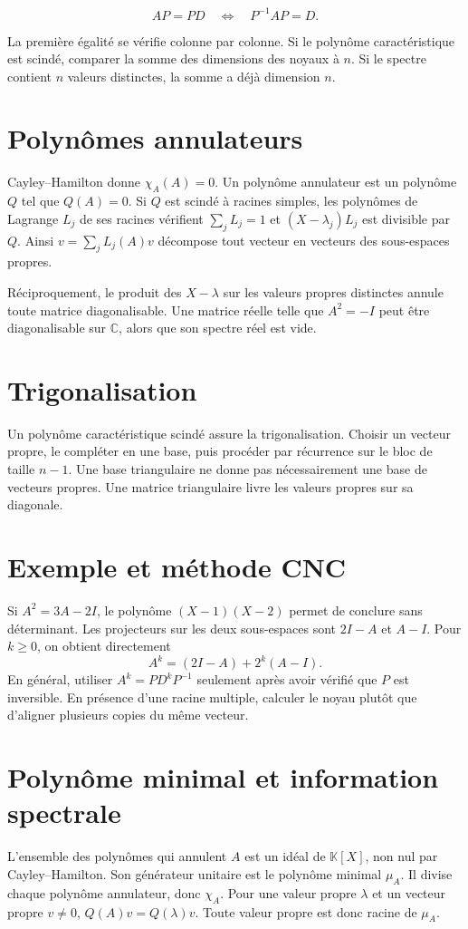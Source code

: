 \documentclass[11pt,a4paper]{article}
\begin{document}
\[ AP=PD\quad\Longleftrightarrow\quad P^{-1}AP=D. \]

La première égalité se vérifie colonne par colonne. Si le polynôme caractéristique est scindé, comparer la somme des dimensions des noyaux à $n$. Si le spectre contient $n$ valeurs distinctes, la somme a déjà dimension $n$.

\section*{Polynômes annulateurs}
Cayley–Hamilton donne $\chi_A(A)=0$. Un polynôme annulateur est un polynôme $Q$ tel que $Q(A)=0$. Si $Q$ est scindé à racines simples, les polynômes de Lagrange $L_j$ de ses racines vérifient $\sum_j L_j=1$ et $(X-\lambda_j)L_j$ est divisible par $Q$. Ainsi $v=\sum_j L_j(A)v$ décompose tout vecteur en vecteurs des sous-espaces propres.

Réciproquement, le produit des $X-\lambda$ sur les valeurs propres distinctes annule toute matrice diagonalisable. Une matrice réelle telle que $A^2=-I$ peut être diagonalisable sur $\mathbb C$, alors que son spectre réel est vide.

\section*{Trigonalisation}
Un polynôme caractéristique scindé assure la trigonalisation. Choisir un vecteur propre, le compléter en une base, puis procéder par récurrence sur le bloc de taille $n-1$. Une base triangulaire ne donne pas nécessairement une base de vecteurs propres. Une matrice triangulaire livre les valeurs propres sur sa diagonale.

\section*{Exemple et méthode CNC}
Si $A^2=3A-2I$, le polynôme $(X-1)(X-2)$ permet de conclure sans déterminant. Les projecteurs sur les deux sous-espaces sont $2I-A$ et $A-I$. Pour $k\ge0$, on obtient directement
\[ A^k=(2I-A)+2^k(A-I). \]
En général, utiliser $A^k=PD^kP^{-1}$ seulement après avoir vérifié que $P$ est inversible. En présence d’une racine multiple, calculer le noyau plutôt que d’aligner plusieurs copies du même vecteur.

\section*{Polynôme minimal et information spectrale}
L’ensemble des polynômes qui annulent $A$ est un idéal de $\mathbb K[X]$, non nul par Cayley–Hamilton. Son générateur unitaire est le polynôme minimal $\mu_A$. Il divise chaque polynôme annulateur, donc $\chi_A$. Pour une valeur propre $\lambda$ et un vecteur propre $v\ne0$, $Q(A)v=Q(\lambda)v$. Toute valeur propre est donc racine de $\mu_A$.
\end{document}
